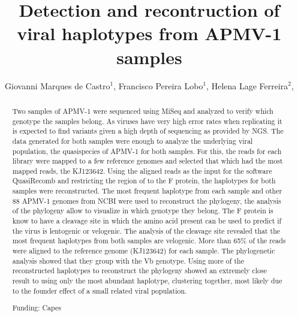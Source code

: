 \documentclass[twoside]{article}
\title{\vspace{-15mm}\fontsize{24pt}{10pt}\selectfont\textbf{ Detection and recontruction of viral haplotypes from APMV-1 samples }} %
\author{ Giovanni Marques de Castro$^{1}$, Francisco Pereira Lobo$^{1}$, Helena Lage Ferreira$^{2}$, }
\affil{ 1 Universidade Federal de Minas Gerais

2 Universidade de São Paulo

 }
\date{}
\begin{document}
  
  
  \maketitle %
  
  
  \thispagestyle{fancy} %
  
  
  \begin{abstract}
  Two samples of APMV-1 were sequenced using MiSeq and analyzed to verify which genotype the samples belong. As viruses have very high error rates when replicating it is expected to find variants given a high depth of sequencing as provided by NGS. The data generated for both samples were enough to analyze the underlying viral population, the quasispecies of APMV-1 for both samples. For this, the reads for each library were mapped to a few reference genomes and selected that which had the most mapped reads, the KJ123642. Using the aligned reads as the input for the software QuasiRecomb and restricting the region of to the F protein, the haplotypes for both samples were reconstructed. The most frequent haplotype from each sample and other 88 APMV-1 genomes from NCBI were used to reconstruct the phylogeny, the analysis of the phylogeny allow to visualize in which genotype they belong. The F protein is know to have a cleavage site in which the amino acid present can be used to predict if the virus is lentogenic or velogenic. The analysis of the cleavage site revealed that the most frequent haplotypes from both samples are velogenic. More than 65\% of the reads were aligned to the reference genome (KJ123642) for each sample. The phylogenetic analysis showed that they group with the Vb genotype. Using more of the reconstructed haplotypes to reconstruct the phylogeny showed an extremely close result to using only the most abundant haplotype, clustering together, most likely due to the founder effect of a small related viral population.
  
  Funding: Capes \\ 
  \end{abstract}
  
\end{document}
